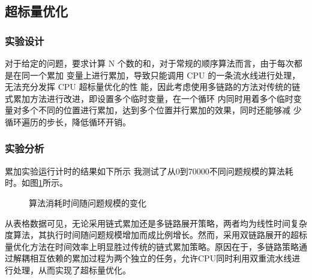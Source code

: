 \documentclass[a4paper]{article}
\begin{document}
    \subsection{超标量优化}
      \subsubsection{实验设计}
对于给定的问题，要求计算 N 个数的和，对于常规的顺序算法而言，由于每次都是在同一个累加
变量上进行累加，导致只能调用 CPU 的一条流水线进行处理，无法充分发挥 CPU 超标量优化的性
能，因此考虑使用多链路的方法对传统的链式累加方法进行改进，即设置多个临时变量，在一个循环
内同时用着多个临时变量对多个不同的位置进行累加，达到多个位置并行累加的效果，同时还能够减
少循环遍历的步长，降低循环开销。
      \subsubsection{实验分析}
累加实验运行计时的结果如下所示
我测试了从0到70000不同问题规模的算法耗时。如图\ref{fig:all2}所示。

               \begin{figure}[!htbp]
                    \centering
                    \centering
                    \caption{算法消耗时间随问题规模的变化}
                    \label{fig:sum2}
                    \label{fig:all2}
                \end{figure}
从表格数据可见，无论采用链式累加还是多链路展开策略，两者均为线性时间复杂度算法，其执行时间随问题规模增加而成比例增长。然而，采用双链路展开的超标量优化方法在时间效率上明显胜过传统的链式累加策略。原因在于，多链路策略通过解耦相互依赖的累加过程为两个独立的任务，允许CPU同时利用双重流水线进行处理，从而实现了超标量优化。
\end{document}
